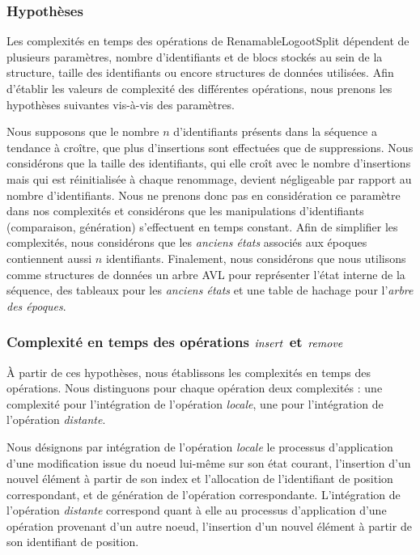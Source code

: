 \label{sec:validation-time-complexity}

\subsubsection{Hypothèses}

Les complexités en temps des opérations de RenamableLogootSplit dépendent de plusieurs paramètres, \eg nombre d'identifiants et de blocs stockés au sein de la structure, taille des identifiants ou encore structures de données utilisées.
Afin d'établir les valeurs de complexité des différentes opérations, nous prenons les hypothèses suivantes vis-à-vis des paramètres.

Nous supposons que le nombre $n$ d'identifiants présents dans la séquence a tendance à croître, \ie que plus d'insertions sont effectuées que de suppressions.
Nous considérons que la taille des identifiants, qui elle croît avec le nombre d'insertions mais qui est réinitialisée à chaque renommage, devient négligeable par rapport au nombre d'identifiants.
Nous ne prenons donc pas en considération ce paramètre dans nos complexités et considérons que les manipulations d'identifiants (comparaison, génération) s'effectuent en temps constant.
Afin de simplifier les complexités, nous considérons que les \emph{anciens états} associés aux époques contiennent aussi $n$ identifiants.
Finalement, nous considérons que nous utilisons comme structures de données un arbre AVL pour représenter l'état interne de la séquence, des tableaux pour les \emph{anciens états} et une table de hachage pour l'\emph{arbre des époques}.

\subsubsection{Complexité en temps des opérations $\mathit{insert}$ et $\mathit{remove}$}

À partir de ces hypothèses, nous établissons les complexités en temps des opérations.
Nous distinguons pour chaque opération deux complexités : une complexité pour l'intégration de l'opération \emph{locale}, une pour l'intégration de l'opération \emph{distante}.

Nous désignons par intégration de l'opération \emph{locale} le processus d'application d'une modification issue du noeud lui-même sur son état courant, \eg l'insertion d'un nouvel élément à partir de son index et l'allocation de l'identifiant de position correspondant, et de génération de l'opération correspondante.
L'intégration de l'opération \emph{distante} correspond quant à elle au processus d'application d'une opération provenant d'un autre noeud, \eg l'insertion d'un nouvel élément à partir de son identifiant de position.

